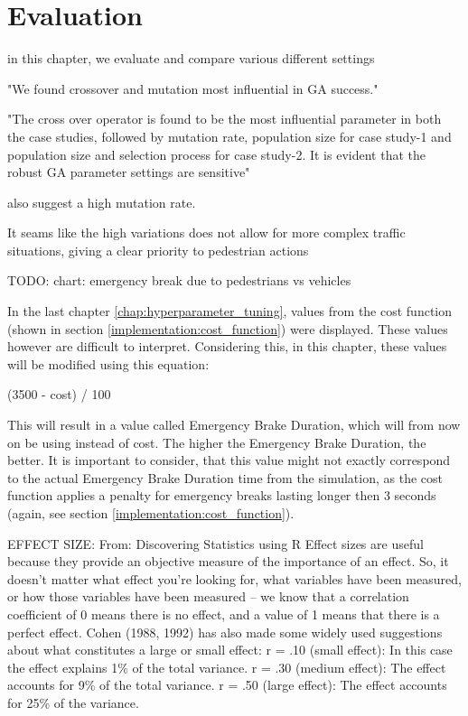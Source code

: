 \chapter{Evaluation}
\label{chap:evaluation}
in this chapter, we evaluate and compare various different settings

"We found crossover and mutation most influential in GA success."\cite{mills_determining_2015}

"The cross over operator is found to be the most influential parameter in both the case studies, followed by mutation rate, population size for case study-1 and population size and selection process for case study-2. It is evident that the robust GA parameter settings are sensitive"\cite{majumdar_genetic_2015}

\cite{boyabatli_parameter_2004} also suggest a high mutation rate.



It seams like the high variations does not allow for more complex traffic situations, giving a clear priority to pedestrian actions

TODO: chart: emergency break due to pedestrians vs vehicles


In the last chapter \ref{chap:hyperparameter_tuning}, values from the cost function (shown in section \ref{implementation:cost_function}) were displayed. These values however are difficult to interpret. Considering this, in this chapter, these values will be modified using this equation:

(3500 - cost) / 100

This will result in a value called Emergency Brake Duration, which will from now on be using instead of cost. The higher the Emergency Brake Duration, the better. It is important to consider, that this value might not exactly correspond to the actual Emergency Brake Duration time from the simulation, as the cost function applies a penalty for emergency breaks lasting longer then 3 seconds (again, see section \ref{implementation:cost_function}).






EFFECT SIZE:
From: Discovering Statistics using R
Effect sizes are useful because they provide an objective measure of the importance of an effect. So, it doesn’t matter what effect you’re looking for, what variables have been measured, or how those variables have been measured – we know that a correlation coefficient of 0 means there is no effect, and a value of 1 means that there is a perfect effect.
Cohen (1988, 1992) has also made some widely used suggestions about what constitutes a large or small effect: 
r = .10 (small effect): In this case the effect explains 1\% of the total variance. 
r = .30 (medium effect): The effect accounts for 9\% of the total variance. 
r = .50 (large effect): The effect accounts for 25\% of the variance.


